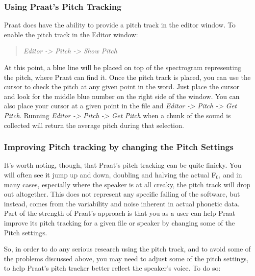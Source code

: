 \hypertarget{using-praats-pitch-tracking}{%
\subsubsection{Using Praat's Pitch
Tracking}\label{using-praats-pitch-tracking}}

\label{pitchtracking} Praat does have the ability to provide a pitch
track in the editor window. To enable the pitch track in the Editor
window:

\begin{quote}
\emph{Editor -\textgreater{} Pitch -\textgreater{} Show Pitch}
\end{quote}

At this point, a blue line will be placed on top of the spectrogram
representing the pitch, where Praat can find it. Once the pitch track is
placed, you can use the cursor to check the pitch at any given point in
the word. Just place the cursor and look for the middle blue number on
the right side of the window. You can also place your cursor at a given
point in the file and \emph{Editor -\textgreater{} Pitch -\textgreater{}
Get Pitch}. Running \emph{Editor -\textgreater{} Pitch -\textgreater{}
Get Pitch} when a chunk of the sound is collected will return the
average pitch during that selection.

\hypertarget{improving-pitch-tracking-by-changing-the-pitch-settings}{%
\subsubsection{Improving Pitch tracking by changing the Pitch
Settings}\label{improving-pitch-tracking-by-changing-the-pitch-settings}}

It's worth noting, though, that Praat's pitch tracking can be quite
finicky. You will often see it jump up and down, doubling and halving
the actual F$_{0}$, and in many cases, especially where the speaker is at all
creaky, the pitch track will drop out altogether. This does not
represent any specific failing of the software, but instead, comes from
the variability and noise inherent in actual phonetic data. Part of the
strength of Praat's approach is that you as a user can help Praat
improve its pitch tracking for a given file or speaker by changing some
of the Pitch settings.

So, in order to do any serious research using the pitch track, and to
avoid some of the problems discussed above, you may need to adjust some
of the pitch settings, to help Praat's pitch tracker better reflect the
speaker's voice. To do so:

